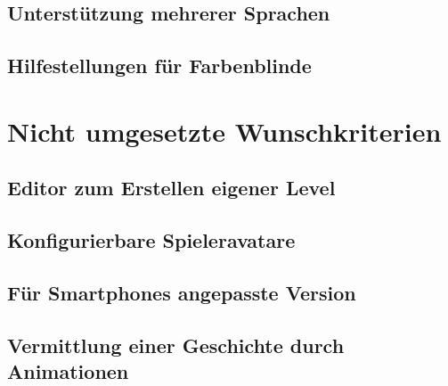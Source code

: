 \subsection{Unterstützung mehrerer Sprachen}

\subsection{Hilfestellungen für Farbenblinde}


\section{Nicht umgesetzte Wunschkriterien}

\subsection{Editor zum Erstellen eigener Level}

\subsection{Konfigurierbare Spieleravatare}

\subsection{Für Smartphones angepasste Version}

\subsection{Vermittlung einer Geschichte durch Animationen}

